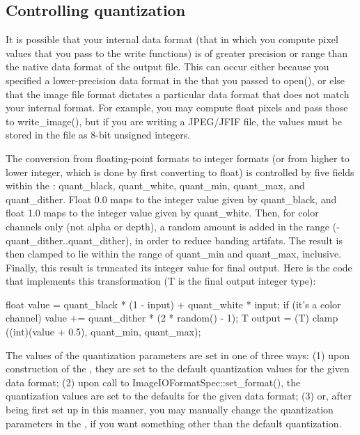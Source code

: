 \subsection{Controlling quantization}
\label{sec:imageoutput:quantization}

It is possible that your internal data format (that in which you compute
pixel values that you pass to the {\cf write} functions) is of greater
precision or range than the native data format of the output file.  This
can occur either because you specified a lower-precision data format in
the \ImageIOFormatSpec that you passed to {\cf open()}, or else that the
image file format dictates a particular data format that does not match
your internal format.  For example, you may compute {\cf float} pixels
and pass those to {\cf write_image()}, but if you are writing a
JPEG/JFIF file, the values must be stored in the file as 8-bit unsigned
integers.

The conversion from floating-point formats to integer formats (or from
higher to lower integer, which is done by first converting to float) is
controlled by five fields within the \ImageIOFormatSpec: {\cf
  quant_black}, {\cf quant_white}, {\cf quant_min}, {\cf quant_max},
and {\cf quant_dither}.
Float 0.0 maps to the integer value given by {\cf quant_black}, and
float 1.0 maps to the integer value given by {\cf quant_white}.  Then,
for color channels only (not alpha or depth), a random amount is added
in the range ({\cf -quant_dither..quant_dither}), in order to reduce
banding artifats.  The result is then clamped to lie within the range of
{\cf quant_min} and {\cf quant_max}, inclusive.  Finally, this result is
truncated its integer value for final output.  Here is the code that
implements this transformation ({\cf T} is the final output integer
type):

\begin{code}
        float value = quant_black * (1 - input) + quant_white * input;
        if (it's a color channel)
            value += quant_dither * (2 * random() - 1);
        T output = (T) clamp ((int)(value + 0.5), quant_min, quant_max);
\end{code}

The values of the quantization parameters are set in one of three ways:
(1) upon construction of the \ImageIOFormatSpec, they are set to the
default quantization values for the given data format; (2) upon call to
{\cf ImageIOFormatSpec::set_format()}, the quantization values are set
to the defaults for the given data format; (3) or, after being first set
up in this manner, you may manually change the quantization parameters
in the \ImageIOFormatSpec, if you want something other than the default
quantization.

